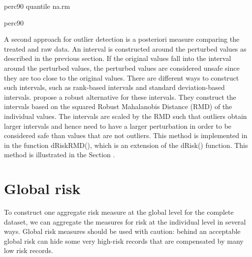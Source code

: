 \documentclass[letterpaper,10pt,english]{sphinxmanual}
\begin{document}
\def\sphinxLiteralBlockLabel{\label{\detokenize{measure_risk:code410}}}
%
\begin{sphinxVerbatim}[commandchars=\\\{\},numbers=left,firstnumber=1,stepnumber=1]
 perc90  quantile\PYG{p}{[}\PYG{p}{]}  na.rm  

 \PYG{p}{[}\PYG{p}{[} \PYG{p}{]}  perc90 \PYG{p}{]}
\end{sphinxVerbatim}

A second approach for outlier detection is a posteriori measure
comparing the treated and raw data. An interval is constructed around
the perturbed values as described in the previous section. If the
original values fall into the interval around the perturbed values, the
perturbed values are considered unsafe since they are too close to the
original values. There are different ways to construct such intervals,
such as rank-based intervals and standard deviation-based intervals.
{\hyperref[\detokenize{measure_risk:teme08}]{}} propose a robust alternative for these
intervals. They construct the intervals based on the squared Robust
Mahalanobis Distance (RMD) of the individual values. The intervals are
scaled by the RMD such that outliers obtain larger intervals and hence
need to have a larger perturbation in order to be considered safe than
values that are not outliers. This method is implemented in 
in the function dRiskRMD(), which is an extension of the dRisk()
function. This method is illustrated in the Section .


\section{Global risk}
\label{\detokenize{measure_risk:global-risk}}
To construct one aggregate risk measure at the global level for the
complete dataset, we can aggregate the measures for risk at the
individual level in several ways. Global risk measures should be used
with caution: behind an acceptable global risk can hide some very
high-risk records that are compensated by many low risk records.
\end{document}
